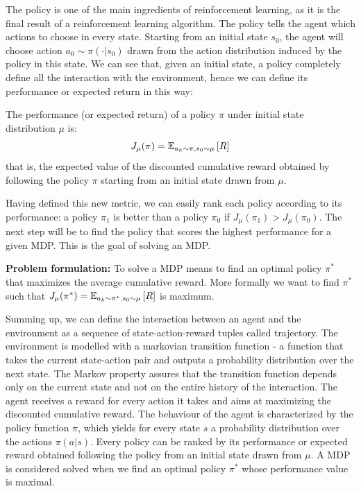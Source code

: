 The policy is one of the main ingredients of reinforcement learning, as it is the final result of a reinforcement learning algorithm. The policy tells the agent which actions to choose in every state.
Starting from an initial state $s_0$, the agent will choose action $a_0 \sim \pi(\cdot | s_0)$ drawn from the action distribution induced by the policy in this state. We can see that, given an initial state, a policy completely define all the interaction with the environment, hence we can define its performance or expected return in this way:
\begin{definition}
The performance (or expected return) of a policy $\pi$ under initial state distribution $\mu$ is:
\[
J_\mu(\pi) = \EV[a_k \sim \pi, s_0 \sim \mu]{R}
\]
that is, the expected value of the discounted cumulative reward obtained by following the policy $\pi$ starting from an initial state drawn from $\mu$.
\end{definition}
Having defined this new metric, we can easily rank each policy according to its performance: a policy $\pi_1$ is better than a policy $\pi_0$ if $J_\mu(\pi_1) > J_\mu(\pi_0)$. The next step will be to find the policy that scores the highest performance for a given MDP. This is the goal of solving an MDP.

\textbf{Problem formulation:}\quad
To solve a MDP means to find an optimal policy $\pi^*$ that maximizes the average cumulative reward. More formally we want to find $\pi^*$ such that $J_\mu(\pi^*)=\EV[a_k \sim \pi^*, s_0 \sim \mu]{R}$ is maximum.

Summing up, we can define the interaction between an agent and the environment as a sequence of state-action-reward tuples called trajectory. The environment is modelled with a markovian transition function - a function that takes the current state-action pair and outputs a probability distribution over the next state. The Markov property assures that the transition function depends only on the current state and not on the entire history of the interaction. The agent receives a reward for every action it takes and aims at maximizing the discounted cumulative reward. The behaviour of the agent is characterized by the policy function $\pi$, which yields for every state $s$ a probability distribution over the actions $\pi(a|s)$. Every policy can be ranked by its performance or expected reward obtained following the policy from an initial state drawn from $\mu$. A MDP is considered solved when we find an optimal policy $\pi^*$ whose performance value is maximal.

